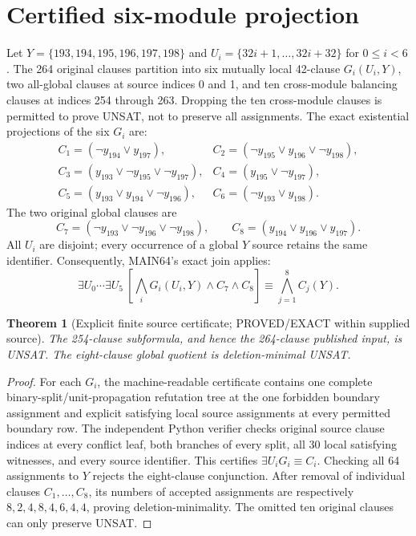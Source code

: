 \documentclass[11pt]{article}
\newtheorem{theorem}{Theorem}
\begin{document}
\section{Certified six-module projection}
Let $Y=\{193,194,195,196,197,198\}$ and $U_i=\{32i+1,\ldots,32i+32\}$ for $0\le i<6$. The 264 original clauses partition into six mutually local 42-clause $G_i(U_i,Y)$, two all-global clauses at source indices 0 and 1, and ten cross-module balancing clauses at indices 254 through 263. Dropping the ten cross-module clauses is permitted to prove UNSAT, not to preserve all assignments. The exact existential projections of the six $G_i$ are:
\[
\begin{array}{ll}
C_1=(\neg y_{194}\vee y_{197}),&
C_2=(\neg y_{195}\vee y_{196}\vee\neg y_{198}),\\
C_3=(y_{193}\vee\neg y_{195}\vee\neg y_{197}),&
C_4=(y_{195}\vee\neg y_{197}),\\
C_5=(y_{193}\vee y_{194}\vee\neg y_{196}),&
C_6=(\neg y_{193}\vee y_{198}).
\end{array}
\]
The two original global clauses are
\[
C_7=(\neg y_{193}\vee\neg y_{196}\vee\neg y_{198}),\qquad
C_8=(y_{194}\vee y_{196}\vee y_{197}).
\]
All $U_i$ are disjoint; every occurrence of a global $Y$ source retains the same identifier. Consequently, MAIN64's exact join applies:
\[
\exists U_0\cdots\exists U_5\ \left[\bigwedge_iG_i(U_i,Y)\wedge C_7\wedge C_8\right]
\equiv \bigwedge_{j=1}^{8} C_j(Y).
\]
\begin{theorem}[Explicit finite source certificate; PROVED/EXACT within supplied source]
The 254-clause subformula, and hence the 264-clause published input, is UNSAT. The eight-clause global quotient is deletion-minimal UNSAT.
\end{theorem}
\begin{proof}
For each $G_i$, the machine-readable certificate contains one complete binary-split/unit-propagation refutation tree at the one forbidden boundary assignment and explicit satisfying local source assignments at every permitted boundary row. The independent Python verifier checks original source clause indices at every conflict leaf, both branches of every split, all 30 local satisfying witnesses, and every source identifier. This certifies $\exists U_i G_i\equiv C_i$. Checking all 64 assignments to $Y$ rejects the eight-clause conjunction. After removal of individual clauses $C_1,\ldots,C_8$, its numbers of accepted assignments are respectively $8,2,4,8,4,6,4,4$, proving deletion-minimality. The omitted ten original clauses can only preserve UNSAT.
\end{proof}
\end{document}
